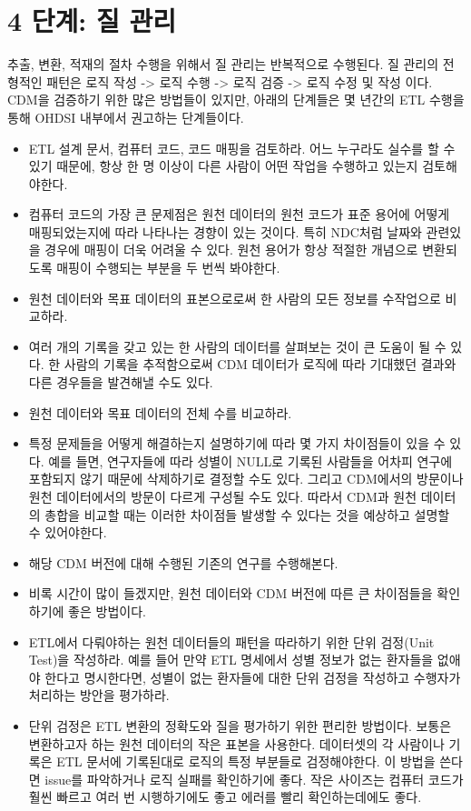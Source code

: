\documentclass[11pt]{book}
\providecommand{\tightlist}{%
  \setlength{\itemsep}{0pt}\setlength{\parskip}{0pt}}
\theoremstyle{definition}
\theoremstyle{definition}
\theoremstyle{definition}
\theoremstyle{remark}
\begin{document}
\section{4 단계: 질 관리}\label{--}

추출, 변환, 적재의 절차 수행을 위해서 질 관리는 반복적으로 수행된다. 질
관리의 전형적인 패턴은 로직 작성 -\textgreater{} 로직 수행
-\textgreater{} 로직 검증 -\textgreater{} 로직 수정 및 작성 이다. CDM을
검증하기 위한 많은 방법들이 있지만, 아래의 단계들은 몇 년간의 ETL 수행을
통해 OHDSI 내부에서 권고하는 단계들이다. 

\begin{itemize}
\tightlist
\item
  ETL 설계 문서, 컴퓨터 코드, 코드 매핑을 검토하라. 어느 누구라도 실수를
  할 수 있기 때문에, 항상 한 명 이상이 다른 사람이 어떤 작업을 수행하고
  있는지 검토해야한다.
\item
  컴퓨터 코드의 가장 큰 문제점은 원천 데이터의 원천 코드가 표준 용어에
  어떻게 매핑되었는지에 따라 나타나는 경향이 있는 것이다. 특히 NDC처럼
  날짜와 관련있을 경우에 매핑이 더욱 어려울 수 있다. 원천 용어가 항상
  적절한 개념으로 변환되도록 매핑이 수행되는 부분을 두 번씩 봐야한다.
\item
  원천 데이터와 목표 데이터의 표본으로로써 한 사람의 모든 정보를
  수작업으로 비교하라.
\item
  여러 개의 기록을 갖고 있는 한 사람의 데이터를 살펴보는 것이 큰 도움이
  될 수 있다. 한 사람의 기록을 추적함으로써 CDM 데이터가 로직에 따라
  기대했던 결과와 다른 경우들을 발견해낼 수도 있다.
\item
  원천 데이터와 목표 데이터의 전체 수를 비교하라.
\item
  특정 문제들을 어떻게 해결하는지 설명하기에 따라 몇 가지 차이점들이
  있을 수 있다. 예를 들면, 연구자들에 따라 성별이 NULL로 기록된 사람들을
  어차피 연구에 포함되지 않기 때문에 삭제하기로 결정할 수도 있다. 그리고
  CDM에서의 방문이나 원천 데이터에서의 방문이 다르게 구성될 수도 있다.
  따라서 CDM과 원천 데이터의 총합을 비교할 때는 이러한 차이점들 발생할
  수 있다는 것을 예상하고 설명할 수 있어야한다.
\item
  해당 CDM 버전에 대해 수행된 기존의 연구를 수행해본다.
\item
  비록 시간이 많이 들겠지만, 원천 데이터와 CDM 버전에 따른 큰 차이점들을
  확인하기에 좋은 방법이다.
\item
  ETL에서 다뤄야하는 원천 데이터들의 패턴을 따라하기 위한 단위 검정(Unit
  Test)을 작성하라. 예를 들어 만약 ETL 명세에서 성별 정보가 없는
  환자들을 없애야 한다고 명시한다면, 성별이 없는 환자들에 대한 단위
  검정을 작성하고 수행자가 처리하는 방안을 평가하라.
\item
  단위 검정은 ETL 변환의 정확도와 질을 평가하기 위한 편리한 방법이다.
  보통은 변환하고자 하는 원천 데이터의 작은 표본을 사용한다. 데이터셋의
  각 사람이나 기록은 ETL 문서에 기록된대로 로직의 특정 부분들로
  검정해야한다. 이 방법을 쓴다면 issue를 파악하거나 로직 실패를
  확인하기에 좋다. 작은 사이즈는 컴퓨터 코드가 훨씬 빠르고 여러 번
  시행하기에도 좋고 에러를 빨리 확인하는데에도 좋다.
\end{itemize}
\end{document}
